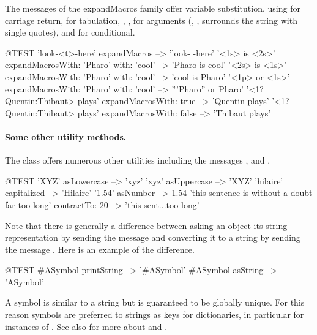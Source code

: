 \documentclass[a4paper,10pt,twoside]{book}
\begin{document}
The messages of the expandMacros family offer variable substitution, using  for carriage return,  for tabulation, , ,  for arguments (, , surrounds the string with single quotes), and  for conditional.

\begin{code}{@TEST}
'look-<t>-here' expandMacros                                         --> 'look-	-here'
'<1s> is <2s>' expandMacrosWith: 'Pharo' with: 'cool'   --> 'Pharo is cool'
'<2s> is <1s>' expandMacrosWith: 'Pharo' with: 'cool'   --> 'cool is Pharo'
'<1p> or <1s>' expandMacrosWith: 'Pharo' with: 'cool'  --> '''Pharo'' or Pharo'
'<1?Quentin:Thibaut> plays' expandMacrosWith: true     --> 'Quentin plays'
'<1?Quentin:Thibaut> plays' expandMacrosWith: false    --> 'Thibaut plays'
\end{code}

\paragraph{Some other utility methods.}
The class  offers numerous other utilities including the messages ,  and . 

\begin{code}{@TEST}
'XYZ' asLowercase --> 'xyz'
'xyz' asUppercase   --> 'XYZ'
'hilaire' capitalized   --> 'Hilaire'
'1.54' asNumber      --> 1.54
'this sentence is without a doubt far too long' contractTo: 20 --> 'this sent...too long'
\end{code}

Note that there is generally a difference between asking an object its string representation by sending the message  and converting it to a string by sending the message .
Here is an example of the difference.

\begin{code}{@TEST}
#ASymbol printString --> '#ASymbol'
#ASymbol asString    --> 'ASymbol'
\end{code}

A symbol is similar to a string but is guaranteed to be globally unique.  For this reason symbols are preferred to strings as keys for dictionaries, in particular for instances of .
See also  for more about  and .

\end{document}
